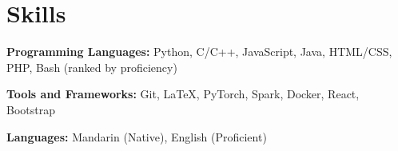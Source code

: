 \documentclass{resume}
\begin{document}



\section{Skills}
\textbf{Programming Languages:} \small Python, C/C++, JavaScript, Java, HTML/CSS, PHP, Bash (ranked by proficiency)

\textbf{Tools and Frameworks:} \small Git, \LaTeX, PyTorch, Spark, Docker, React, Bootstrap

\textbf{Languages:} \small Mandarin (Native), English (Proficient)
\end{document}

